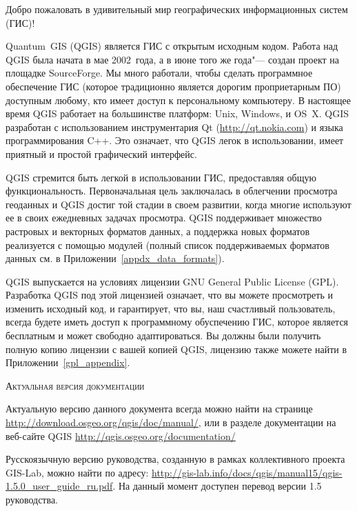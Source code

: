 \mainmatter
\pagestyle{scrheadings}
\label{label_forward}
\setcounter{page}{1}



Добро пожаловать в удивительный мир географических информационных систем
(ГИС)!

Quantum~GIS (QGIS) является ГИС с открытым исходным кодом. Работа
над QGIS была начата в мае 2002~года, а в июне того же года"--- создан
проект на площадке SourceForge. Мы много работали, чтобы сделать
программное обеспечение ГИС (которое традиционно является дорогим
проприетарным ПО) доступным любому, кто имеет
доступ к персональному компьютеру. В настоящее время QGIS работает на
большинстве платформ: Unix, Windows, и OS~X. QGIS разработан с
использованием инструментария Qt (\url{http://qt.nokia.com}) и языка
программирования C++.
Это означает, что QGIS легок в использовании, имеет приятный и простой
графический интерфейс.

QGIS стремится быть легкой в использовании ГИС, предоставляя общую
функциональность. Первоначальная цель заключалась в облегчении
просмотра геоданных и QGIS достиг той стадии в своем развитии, когда
многие используют ее в своих ежедневных задачах просмотра.
QGIS поддерживает множество растровых и векторных форматов данных, а
поддержка новых форматов реализуется с помощью модулей (полный список
поддерживаемых форматов данных см. в Приложении~\ref{appdx_data_formats}).

QGIS выпускается на условиях лицензии GNU General Public License (GPL).
Разработка QGIS под этой лицензией означает, что вы можете просмотреть и
изменить исходный код, и гарантирует, что вы, наш счастливый
пользователь, всегда будете иметь доступ к программному обуспечению ГИС,
которое является бесплатным и может свободно адаптироваться. Вы должны
были получить полную копию лицензии с вашей копией QGIS, лицензию также
можете найти в Приложении~\ref{gpl_appendix}.

\begin{Tip}\caption{\textsc{Актуальная версия документации}}
Актуальную версию данного документа всегда можно найти на странице
\url{http://download.osgeo.org/qgis/doc/manual/}, или в разделе
документации на веб-сайте QGIS \url{http://qgis.osgeo.org/documentation/}
\end{Tip}

Русскоязычную версию руководства, созданную в рамках коллективного
проекта GIS-Lab, можно найти по адресу:
\url{http://gis-lab.info/docs/qgis/manual15/qgis-1.5.0_user_guide_ru.pdf}.
На данный момент доступен перевод версии 1.5 руководства.

